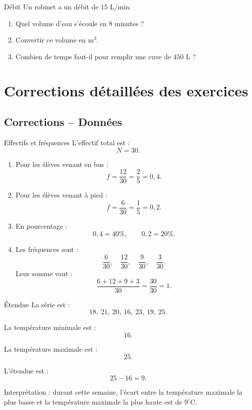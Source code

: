 \documentclass[11pt,a4paper]{article}
\begin{document}
\begin{exercisebox}{Débit}
Un robinet a un débit de $15$ L/min.

\begin{enumerate}
    \item Quel volume d'eau s'écoule en $8$ minutes ?
    \item Convertir ce volume en m$^3$.
    \item Combien de temps faut-il pour remplir une cuve de $450$ L ?
\end{enumerate}
\end{exercisebox}

\newpage

\section{Corrections détaillées des exercices}

\subsection{Corrections -- Données}

\begin{correctionbox}{Effectifs et fréquences}
L'effectif total est :
\[
N=30.
\]

\begin{enumerate}
    \item Pour les élèves venant en bus :
    \[
    f=\frac{12}{30}=\frac{2}{5}=0{,}4.
    \]
    \item Pour les élèves venant à pied :
    \[
    f=\frac{6}{30}=\frac{1}{5}=0{,}2.
    \]
    \item En pourcentage :
    \[
    0{,}4=40\%,\qquad 0{,}2=20\%.
    \]
    \item Les fréquences sont :
    \[
    \frac{6}{30},\quad \frac{12}{30},\quad \frac{9}{30},\quad \frac{3}{30}.
    \]
    Leur somme vaut :
    \[
    \frac{6+12+9+3}{30}=\frac{30}{30}=1.
    \]
\end{enumerate}
\end{correctionbox}

\begin{correctionbox}{Étendue}
La série est :
\[
18,\ 21,\ 20,\ 16,\ 23,\ 19,\ 25.
\]

La température minimale est :
\[
16.
\]

La température maximale est :
\[
25.
\]

L'étendue est :
\[
25-16=9.
\]

Interprétation : durant cette semaine, l'écart entre la température maximale la plus basse et la température maximale la plus haute est de $9^\circ$C.
\end{correctionbox}
\end{document}
